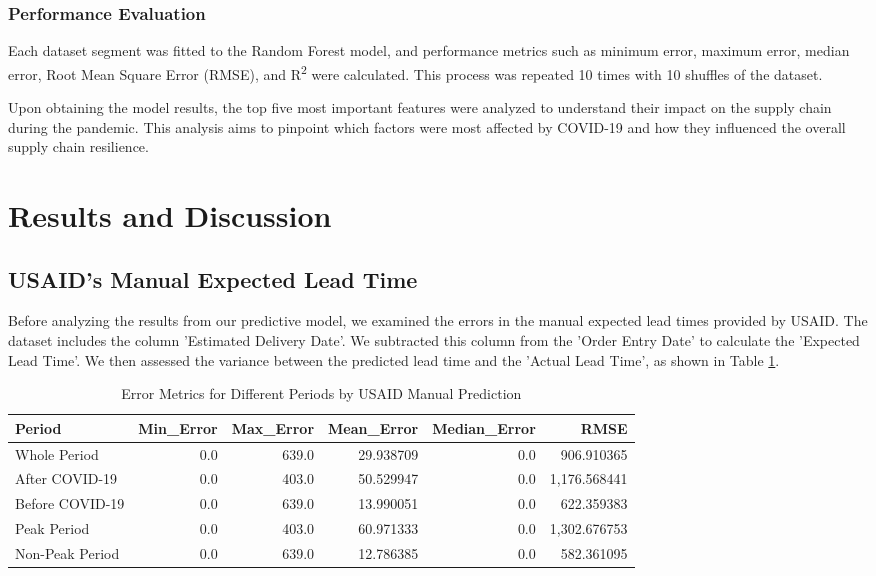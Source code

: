 \documentclass[12pt]{report}
\begin{document}
\subsubsection{Performance Evaluation}
Each dataset segment was fitted to the Random Forest model, and performance metrics such as minimum error, maximum error, median error, Root Mean Square Error (RMSE), and R\textsuperscript{2} were calculated. This process was repeated 10 times with 10 shuffles of the dataset.

Upon obtaining the model results, the top five most important features were analyzed to understand their impact on the supply chain during the pandemic. This analysis aims to pinpoint which factors were most affected by COVID-19 and how they influenced the overall supply chain resilience.

\section{Results and Discussion}
\label{sec:sc_results}
\subsection{USAID's Manual Expected Lead Time}
Before analyzing the results from our predictive model, we examined the errors in the manual expected lead times provided by USAID. The dataset includes the column 'Estimated Delivery Date'. We subtracted this column from the 'Order Entry Date' to calculate the 'Expected Lead Time'. We then assessed the variance between the predicted lead time and the 'Actual Lead Time', as shown in Table \ref{tab:error_metrics}.

\begin{table}[H]
\centering
\begin{tabular}{|l|r|r|r|r|r|}
\hline
\textbf{Period} & \textbf{Min\_Error} & \textbf{Max\_Error} & \textbf{Mean\_Error} & \textbf{Median\_Error} & \textbf{RMSE} \\
\hline
Whole Period     & 0.0 & 639.0 & 29.938709 & 0.0 & 906.910365 \\
After COVID-19   & 0.0 & 403.0 & 50.529947 & 0.0 & 1,176.568441 \\
Before COVID-19  & 0.0 & 639.0 & 13.990051 & 0.0 & 622.359383 \\
Peak Period      & 0.0 & 403.0 & 60.971333 & 0.0 & 1,302.676753 \\
Non-Peak Period  & 0.0 & 639.0 & 12.786385 & 0.0 & 582.361095 \\
\hline
\end{tabular}
\caption{Error Metrics for Different Periods by USAID Manual Prediction}
\label{tab:error_metrics}
\end{table}
\end{document}
